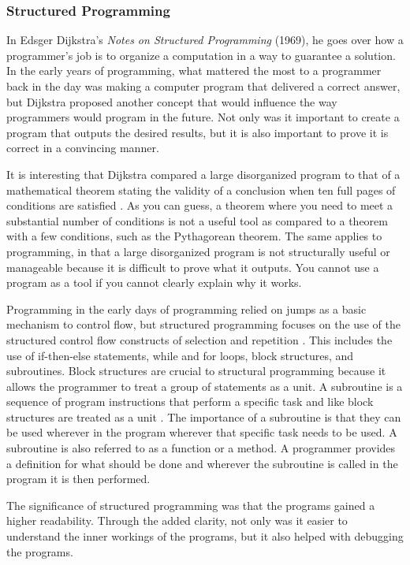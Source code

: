 \documentclass{article}
\begin{document}
\subsubsection{Structured Programming}
In Edsger Dijkstra’s \textit{Notes on Structured Programming} (1969), he goes over how a programmer's job is to organize a computation in a way to guarantee a solution. In the early years of programming, what mattered the most to a programmer back in the day was making a computer program that delivered a correct answer, but Dijkstra proposed another concept that would influence the way programmers would program in the future. Not only was it important to create a program that outputs the desired results, but it is also important to prove it is correct in a convincing manner. 

\vspace{\baselineskip}
It is interesting that Dijkstra compared a large disorganized program to that of a mathematical theorem stating the validity of a conclusion when ten full pages of conditions are satisfied \cite{7}. As you can guess, a theorem where you need to meet a substantial number of conditions is not a useful tool as compared to a theorem with a few conditions, such as the Pythagorean theorem. The same applies to programming, in that a large disorganized program is not structurally useful or manageable because it is difficult to prove what it outputs. You cannot use a program as a tool if you cannot clearly explain why it works.

\vspace{\baselineskip}
Programming in the early days of programming relied on jumps as a basic mechanism to control flow, but structured programming focuses on the use of the structured control flow constructs of selection and repetition  \cite{8}. This includes the use of if-then-else statements, while and for loops, block structures, and subroutines. Block structures are crucial to structural programming because it allows the programmer to treat a group of statements as a unit. A subroutine is a sequence of program instructions that perform a specific task and like block structures are treated as a unit \cite{9}. The importance of a subroutine is that they can be used wherever in the program wherever that specific task needs to be used. A subroutine is also referred to as a function or a method. A programmer provides a definition for what should be done and wherever the subroutine is called in the program it is then performed. 

\vspace{\baselineskip}
The significance of structured programming was that the programs gained a higher readability. Through the added clarity, not only was it easier to understand the inner workings of the programs, but it also helped with debugging the programs.
\end{document}
